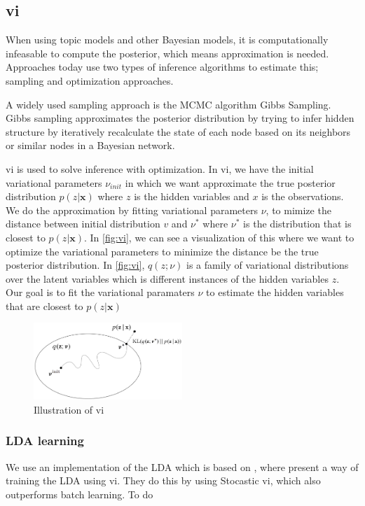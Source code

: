 \subsection{\gls{vi}}
When using topic models and other Bayesian models, it is computationally infeasable to compute the posterior, which means approximation is needed. 
Approaches today use two types of inference algorithms to estimate this; sampling and optimization approaches.

A widely used sampling approach is the MCMC algorithm Gibbs Sampling.
Gibbs sampling approximates the posterior distribution by trying to infer hidden structure by iteratively recalculate the state of each node based on its neighbors or similar nodes in a Bayesian network.

\gls{vi} is used to solve inference with optimization.
In \gls{vi}, we have the initial variational parameters $\nu_{init}$ in which we want approximate the true posterior distribution $p(z|\textbf{x})$ where $z$ is the hidden variables and $x$ is the observations.
We do the approximation by fitting variational parameters $\nu$, to mimize the distance between initial distribution $v$ and $\nu^*$ where $\nu^*$ is the distribution that is closest to $p(z|\textbf{x})$.
In \autoref{fig:vi}, we can see a visualization of this where we want to optimize the variational parameters to minimize the distance be the true posterior distribution.
In \autoref{fig:vi}, $q(z; \nu)$ is a family of variational distributions over the latent variables which is different instances of the hidden variables $z$.
Our goal is to fit the variational paramaters $\nu$ to estimate the hidden variables that are closest to $p(z|\textbf{x})$

\begin{figure}
	\centering
	\includegraphics[width=0.5\textwidth]{figures/vi_illustration.png}
	\caption{Illustration of \acrlong{vi}}
	\label{fig:vi}
\end{figure}

\subsubsection{LDA learning}
We use an implementation of the LDA which is based on \cite{blei2010online}, where \citeauthor{blei2010online} present a way of training the LDA using \gls{vi}.
They do this by using Stocastic \gls{vi}, which also outperforms batch learning.
To do  
